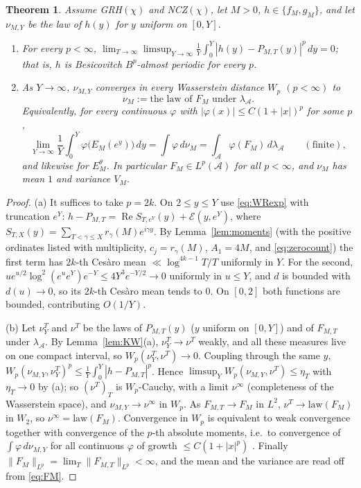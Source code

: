 \documentclass[11pt]{amsart}
\newtheorem{theorem}{Theorem}[section]
\theoremstyle{definition}
\numberwithin{equation}{section}
\newcommand{\cE}{\mathcal E}
\newcommand{\re}{\operatorname{Re}}
\newcommand{\cA}{\mathcal A}          %
\newcommand{\hA}{\lambda_{\cA}}       %
\newcommand{\Ein}{E^{\theta}}
\begin{document}
\begin{theorem}\label{thm:limit}
Assume GRH$(\chi)$ and NCZ$(\chi)$, let $M>0$, $h\in\{f_M,g_M\}$, and
let $\nu_{M,Y}$ be the law of $h(y)$ for $y$ uniform on $[0,Y]$.
\begin{enumerate}
\item[(a)] For every $p<\infty$,
$\lim_{T\to\infty}\limsup_{Y\to\infty}\frac1Y\int_0^Y
|h(y)-P_{M,T}(y)|^p\,dy=0$; that is, $h$ is Besicovitch
$B^p$-almost periodic for every $p$.
\item[(b)] As $Y\to\infty$, $\nu_{M,Y}$ converges in every
Wasserstein distance $W_p$ $(p<\infty)$ to
\[
\nu_M:=\text{the law of }F_M\text{ under }\hA .
\]
Equivalently, for every continuous $\varphi$ with
$|\varphi(x)|\le C(1+|x|)^p$ for some $p$,
\[
\lim_{Y\to\infty}\frac1Y\int_0^Y\varphi\bigl(E_M(e^y)\bigr)\,dy
=\int\varphi\,d\nu_M=\int_{\cA}\varphi(F_M)\,d\hA\qquad(\text{finite}),
\]
and likewise for $\Ein_M$. In particular $F_M\in L^p(\cA)$ for all
$p<\infty$, and $\nu_M$ has mean $1$ and variance $V_M$.
\end{enumerate}
\end{theorem}

\begin{proof}
(a) It suffices to take $p=2k$. On $2\le y\le Y$ use
\eqref{eq:WRexp} with truncation $e^Y$:
$h-P_{M,T}=\re S_{T,e^Y}(y)+\cE(y,e^Y)$, where
$S_{T,X}(y)=\sum_{T<\gamma\le X}r_\gamma(M)e^{i\gamma y}$. By
Lemma~\ref{lem:moments} (with the positive ordinates listed with
multiplicity, $c_j=r_\gamma(M)$, $A_1=4M$, and
\eqref{eq:zerocount}) the first term has $2k$-th Ces\`aro mean
$\ll\log^{4k-1}T/T$ uniformly in $Y$. For the second,
$ue^{u/2}\log^2(e^ue^Y)e^{-Y}\le4Y^3e^{-Y/2}\to0$ uniformly in
$u\le Y$, and $d$ is bounded with $d(u)\to0$, so its $2k$-th Ces\`aro
mean tends to $0$. On $[0,2]$ both functions are bounded,
contributing $O(1/Y)$.

(b) Let $\nu^T_Y$ and $\nu^T$ be the laws of $P_{M,T}(y)$
($y$ uniform on $[0,Y]$) and of $F_{M,T}$ under $\hA$. By
Lemma~\ref{lem:KW}(a), $\nu^T_Y\to\nu^T$ weakly, and all these
measures live on one compact interval, so
$W_p(\nu^T_Y,\nu^T)\to0$. Coupling through the same $y$,
$W_p(\nu_{M,Y},\nu^T_Y)^p\le\frac1Y\int_0^Y|h-P_{M,T}|^p$. Hence
$\limsup_YW_p(\nu_{M,Y},\nu^T)\le\eta_T$ with $\eta_T\to0$ by (a); so
$(\nu^T)_T$ is $W_p$-Cauchy, with a limit $\nu^\infty$ (completeness
of the Wasserstein space), and $\nu_{M,Y}\to\nu^\infty$ in $W_p$. As
$F_{M,T}\to F_M$ in $L^2$, $\nu^T\to\mathrm{law}(F_M)$ in $W_2$, so
$\nu^\infty=\mathrm{law}(F_M)$. Convergence in $W_p$ is equivalent to
weak convergence together with convergence of the $p$-th absolute
moments, i.e.\ to convergence of $\int\varphi\,d\nu_{M,Y}$ for all
continuous $\varphi$ of growth $\le C(1+|x|^p)$
\cite[Theorem~6.9]{Vil09}. Finally
$\|F_M\|_{L^p}=\lim_T\|F_{M,T}\|_{L^p}<\infty$, and the mean and the
variance are read off from \eqref{eq:FM}.
\end{proof}
\end{document}
